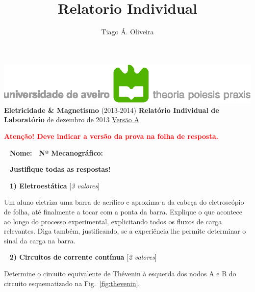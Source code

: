 \documentclass[11pt,a4paper,final]{article}
\author{Tiago Á. Oliveira}
\title{Relatorio Individual}
\begin{document}
\begin{center}
\includegraphics[scale=1]{figs/logo_UA}
\linebreak\linebreak
\LARGE\textbf{Eletricidade \& Magnetismo}
\normalsize\linebreak
(2013-2014)
\linebreak\linebreak
\textbf{Relat\'{o}rio Individual de Laborat\'{o}rio}
 de dezembro de 2013
\linebreak\linebreak
\underline{Vers\~{a}o A}
\end{center}

\noindent\textcolor{red}{\textbf{Aten\c{c}\~{a}o! Deve indicar a versão da prova na folha de resposta.}}


~\linebreak
\noindent\textbf{Nome:}~\underline{\hspace{9cm}}~\textbf{Nº Mecanogr\'{a}fico:}~\underline{\hspace{2.5cm}}

~\linebreak
\noindent\textbf{Justifique todas as respostas!}

~\linebreak
\noindent\textbf{1) Eletroest\'{a}tica} \hfill [\textit{3 valores}]

Um aluno eletriza uma barra de acr\'{i}lico e aproxima-a da cabe\c{c}a do eletrosc\'{o}pio de folha, at\'{e} finalmente a tocar com a ponta da barra. Explique o que acontece ao longo do processo experimental, explicitando todos os fluxos de carga relevantes. Diga tamb\'{e}m, justificando, se a experi\^{e}ncia lhe permite determinar o sinal da carga na barra.

~\linebreak
\noindent\textbf{2) Circuitos de corrente cont\'{i}nua} \hfill [\textit{2 valores}]

Determine o circuito equivalente de Th\'{e}venin \`{a} esquerda dos nodos A e B do circuito esquematizado na Fig.~\ref{fig:thevenin}.
\end{document}
